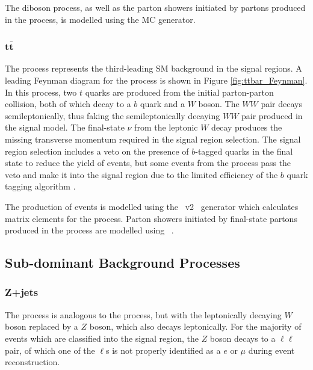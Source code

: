 The diboson process, as well as the parton showers initiated by partons produced in the process, is modelled using the \SHERPA[2.2] MC generator. 

\subsubsection{\(\mathbf{t\bar{t}}\)}
\label{sec:ttbar_description}

The \ttbar process represents the third-leading SM background in the signal regions. A leading Feynman diagram for the process is shown in Figure \ref{fig:ttbar_Feynman}. In this process, two \(t\) quarks are produced from the initial parton-parton collision, both of which decay to a \(b\) quark and a \(W\) boson. The \(WW\) pair decays semileptonically, thus faking the semileptonically decaying \(WW\) pair produced in the signal model. The final-state \(\nu\) from the leptonic \(W\) decay produces the missing transverse momentum required in the signal region selection. The signal region selection includes a veto on the presence of \(b\)-tagged quarks in the final state to reduce the yield of \ttbar events, but some events from the process pass the veto and make it into the signal region due to the limited efficiency of the \(b\) quark tagging algorithm \cite{Varni:2742644}.

The production of \ttbar events is modelled using the \POWHEGBOX~v2~\cite{Frixione:2007nw,Nason:2004rx,Frixione:2007vw,Alioli:2010xd} generator which calculates matrix elements for the process. Parton showers initiated by final-state partons produced in the \ttbar process are modelled using ~\cite{Sjostrand:2014zea}. 

\subsection{Sub-dominant Background Processes}

\subsubsection{Z+jets}
\label{sec:zjets_description}

The \zjets process is analogous to the \wjets process, but with the leptonically decaying \(W\) boson replaced by a \(Z\) boson, which also decays leptonically. For the majority of \zjets events which are classified into the signal region, the \(Z\) boson decays to a \(\ell\ell\) pair, of which one of the \(\ell\)s is not properly identified as a \(e\) or \(\mu\) during event reconstruction. 

